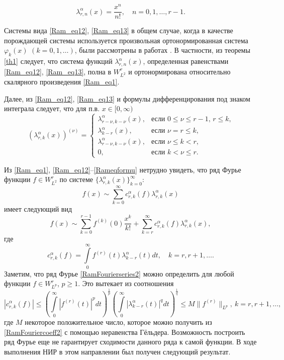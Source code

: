\begin{equation}\label{Ram_eq13}
\lambda_{r,n}^{\alpha}(x) =\frac{x^n}{n!}, \quad n=0,1,\ldots, r-1.
\end{equation}

Системы вида \eqref{Ram_eq12}, \eqref{Ram_eq13} в общем случае, когда в качестве порождающей системы используется произвольная ортонормированная система $\varphi_k(x)$ $(k=0,1,\ldots)$, были рассмотрены в работах \cite{SharIzv2018, rep2017-ramis-Gadz16, Shar2017, rep2017-ramis-Gadz1, rep2017-ramis-shGadjGadjMir}.
В частности, из теоремы \ref{th1} \cite{SharIzv2018} следует, что система функций $\lambda_{r,n}^\alpha(x)$, определенная равенствами \eqref{Ram_eq12}, \eqref{Ram_eq13}, полна в $W^r_{L^2}$ и ортонормирована относительно скалярного произведения \eqref{Ram_eq1}.

Далее, из \eqref{Ram_eq12}, \eqref{Ram_eq13} и формулы дифференцирования под знаком интеграла \cite[п. 509, с. 667]{rep2017-sobcheb_urav-fiht2} следует, что для п.в. $x\in[0,\infty)$
\begin{equation}\label{Rameqformu}
(\lambda_{r,k}^\alpha(x))^{(\nu)} =
\begin{cases}
\lambda_{r-\nu,k-\nu}^\alpha(x),&\text{если $0\le\nu\le r-1$, $r\le k$,}\\
\lambda_{k-r}^\alpha(x),&\text{если $\nu=r\le k$,}\\
\lambda_{r-\nu,k-\nu}^\alpha(x),&\text{если $\nu\le k< r$,}\\
0,&\text{если $k< \nu\le r$}.
\end{cases}
\end{equation}

Из \eqref{Ram_eq1}, \eqref{Ram_eq12}--\eqref{Rameqformu} нетрудно увидеть, что ряд Фурье функции $f\in W^r_{L^2}$ по системе  $\{\lambda^\alpha_{r,k}(x)\}_{k=0}^\infty$:
\begin{equation*}
f(x)\sim \sum_{k=0}^{\infty}c_{r,k}^\alpha(f)\lambda_{r,k}^\alpha(x)
\end{equation*}
имеет следующий вид
\begin{equation}\label{RamFourierseries2}
f(x)\sim \sum_{k=0}^{r-1}f^{(k)}(0)\frac{x^k}{k!}+\sum_{k=r}^{\infty} c_{r,k}^\alpha(f)\lambda_{r,k}^\alpha(x),
\end{equation}
где
\begin{equation}\label{RamFouriercoeff2}
c_{r,k}^\alpha(f)=\int\limits_0^\infty f^{(r)}(t)\lambda_{k-r}^\alpha(t)dt, \quad k=r, r+1, \ldots.
\end{equation}
Заметим, что ряд Фурье \eqref{RamFourierseries2} можно определить для любой функции $f\in W^r_{L^p}$, $p\geq1$. Это вытекает из соотношения
$$
|c_{r,k}^\alpha(f)|\leq \left(\int\limits_0^\infty|f^{(r)}(t)|^p dt\right)^{\frac{1}{p}}
\left(\int\limits_0^\infty|\lambda_{k-r}^\alpha(t)|^q dt\right)^{\frac{1}{q}}\leq M\|f^{(r)}\|_{L^p},\ k=r, r+1, \ldots,
$$
где $M$ некоторое положительное число, которое можно получить из \eqref{RamFouriercoeff2} с помощью неравенства Гёльдера.
Возможность построить ряд Фурье еще не гарантирует сходимости данного ряда к самой функции. В ходе выполнения НИР в этом направлении был получен следующий результат.

